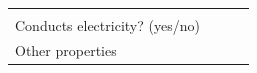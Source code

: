 \begin{enumerate}[noitemsep, label=\textbf{\arabic*}. ]
{\begin{tabular}[t]{|l|l|l|l|}
         &
    
    
     \tabularnewline\cline{1-1}\cline{2-2}\cline{3-3}\cline{4-4}
    
    
        Conducts electricity? (yes/no) &
    
    
         &
    
    
         &
    
    
     \tabularnewline\cline{1-1}\cline{2-2}\cline{3-3}\cline{4-4}
    
    
        Other properties &
    
    
         &
    
    

\end{tabular}}
\end{enumerate}
